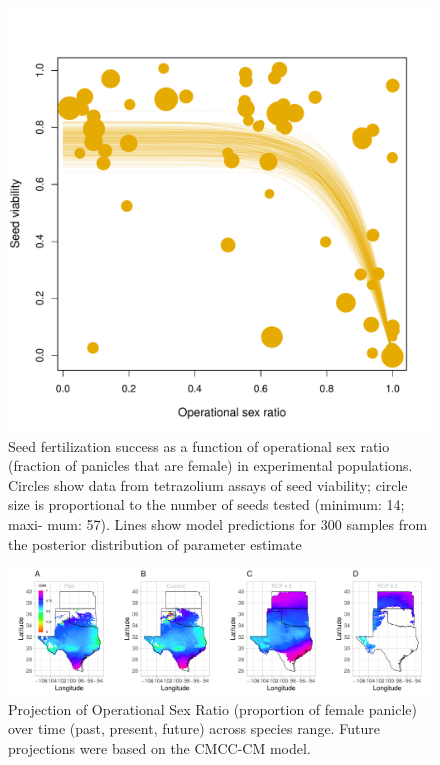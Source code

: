 \documentclass[12pt]{article}\usepackage[]{graphicx}\usepackage[dvipsnames]{xcolor}
\begin{document}
\begin{figure}[H]
   \begin{center}
     \includegraphics[width=0.8\linewidth]{Figures/seed_viabitility.pdf}
   \caption{Seed fertilization success as a function of operational sex ratio (fraction of panicles that are female) in experimental populations. Circles show data from tetrazolium assays of seed viability; circle size is proportional to the number of seeds tested (minimum: 14; maxi- mum: 57). Lines show model predictions  for 300 samples from the posterior distribution of parameter estimate  }
   \label{Sup:seed_ORS}
   \end{center}
 \end{figure}


\begin{figure}[H]
	\begin{center}
		\includegraphics[width=1\linewidth]{Figures/Fig_geo_sr_cmc.pdf}
		\caption{Projection  of Operational Sex Ratio (proportion of female panicle) over time (past, present, future) across species range.
			Future projections were based on the CMCC-CM model.
			}
		\label{Sup:geoosrprojcmc}
	\end{center}
\end{figure}
\end{document}
